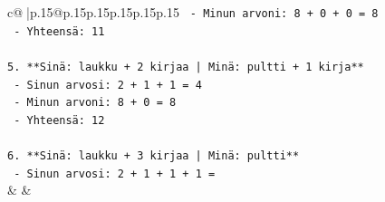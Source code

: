 \documentclass{article}
\begin{document}
{\begin{supertabular}{c@{$\;$}|p{.15\linewidth}@{}p{.15\linewidth}p{.15\linewidth}p{.15\linewidth}p{.15\linewidth}p{.15\linewidth}}
{{{\texttt{   {-} Minun arvoni: 8 + 0 + 0 = 8} \\
\texttt{   {-} Yhteensä: 11} \\
\\ 
\texttt{5. **Sinä: laukku + 2 kirjaa | Minä: pultti + 1 kirja**} \\
\texttt{   {-} Sinun arvosi: 2 + 1 + 1 = 4} \\
\texttt{   {-} Minun arvoni: 8 + 0 = 8} \\
\texttt{   {-} Yhteensä: 12} \\
\\ 
\texttt{6. **Sinä: laukku + 3 kirjaa | Minä: pultti**} \\
\texttt{   {-} Sinun arvosi: 2 + 1 + 1 + 1 =} \\
            }
        }
    }
    & & \\ \\


\end{supertabular}}
\end{document}

